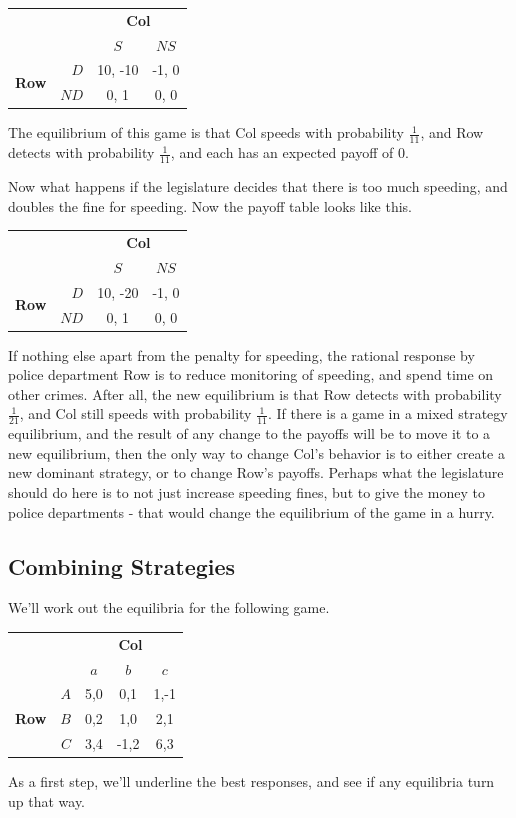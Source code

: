 \documentclass[openany]{book}
\begin{document}
\begin{center}
\begin{tabular}{l r | c c}
& & \multicolumn{2}{c}{\textbf{Col}} \\
& & $S$ & $NS$ \\ \hline
\multirow{2}{*}{\textbf{Row}} & $D$ & 10, -10 & -1, 0 \\
& $ND$ & 0, 1 & 0, 0 
\end{tabular}
\end{center}
The equilibrium of this game is that Col speeds with probability $\frac{1}{11}$, and Row detects with probability $\frac{1}{11}$, and each has an expected payoff of 0. 

Now what happens if the legislature decides that there is too much speeding, and doubles the fine for speeding. Now the payoff table looks like this.

\begin{center}
\begin{tabular}{l r | c c}
& & \multicolumn{2}{c}{\textbf{Col}} \\
& & $S$ & $NS$ \\ \hline
\multirow{2}{*}{\textbf{Row}} & $D$ & 10, -20 & -1, 0 \\
& $ND$ & 0, 1 & 0, 0 
\end{tabular}
\end{center}
If nothing else apart from the penalty for speeding, the rational response by police department Row is to reduce monitoring of speeding, and spend time on other crimes. After all, the new equilibrium is that Row detects with probability $\frac{1}{21}$, and Col still speeds with probability $\frac{1}{11}$. If there is a game in a mixed strategy equilibrium, and the result of any change to the payoffs will be to move it to a new equilibrium, then the only way to change Col's behavior is to either create a new dominant strategy, or to change Row's payoffs. Perhaps what the legislature should do here is to not just increase speeding fines, but to give the money to police departments - that would change the equilibrium of the game in a hurry.

\subsection{Combining Strategies}
We'll work out the equilibria for the following game.

\begin{center}
\begin{tabular}{l r | c c c}
& & \multicolumn{3}{c}{\textbf{Col}} \\
& & $a$ & $b$ & $c$ \\ \hline
\multirow{3}{*}{\textbf{Row}}
& $A$ & 5,0 & 0,1 & 1,-1 \\
& $B$ & 0,2 & 1,0 & 2,1\\
& $C$ & 3,4 & -1,2 & 6,3
\end{tabular}
\end{center}
As a first step, we'll underline the best responses, and see if any equilibria turn up that way.
\end{document}
